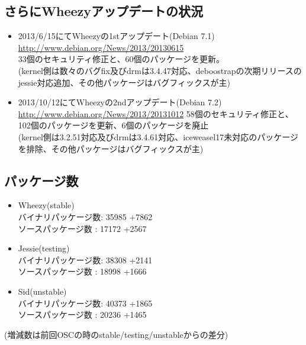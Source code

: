 \documentclass[mingoth,a4paper]{jsarticle}
\begin{document}
\subsection{さらにWheezyアップデートの状況}

\begin{itemize}
\item 2013/6/15にてWheezyの1stアップデート(Debian 7.1)\\
\url{http://www.debian.org/News/2013/20130615}\\
33個のセキュリティ修正と、60個のパッケージを更新。\\
(kernel側は数々のバグfix及びdrmは3.4.47対応、deboostrapの次期リリースのjessie対応追加、その他パッケージはバグフィックスが主)
\item 2013/10/12にてWheezyの2ndアップデート(Debian 7.2)\\
\url{http://www.debian.org/News/2013/20131012}
58個のセキュリティ修正と、102個のパッケージを更新、6個のパッケージを廃止\\
(kernel側は3.2.51対応及びdrmは3.4.61対応、iceweasel17未対応のパッケージを排除、その他パッケージはバグフィックスが主)
\end{itemize}

\subsection{パッケージ数}
\begin{itemize}

\item Wheezy(stable)\\
バイナリパッケージ数: 35985 {\color{red}+7862}\\
ソースパッケージ数  : 17172 {\color{red}+2567}\\
\item Jessie(testing)\\
バイナリパッケージ数: 38308 {\color{red}+2141}\\
ソースパッケージ数  : 18998 {\color{red}+1666}\\
\item Sid(unstable)\\
バイナリパッケージ数: 40373 {\color{red}+1865}\\
ソースパッケージ数  : 20236 {\color{red}+1465}\\
\end{itemize}
(増減数は前回OSCの時のstable/testing/unstableからの差分)
\end{document}

